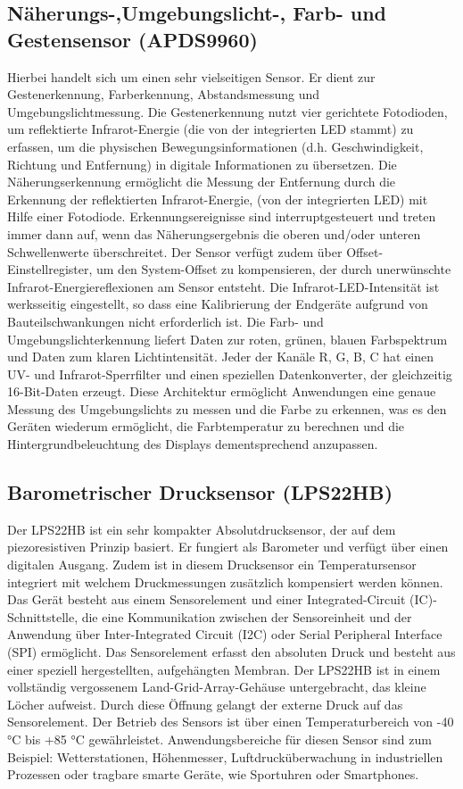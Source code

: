 \subsection{Näherungs-,Umgebungslicht-, Farb- und Gestensensor (APDS9960)}
	Hierbei handelt sich um einen sehr vielseitigen Sensor. Er dient zur Gestenerkennung, Farberkennung, Abstandsmessung und Umgebungslichtmessung. Die Gestenerkennung nutzt vier gerichtete Fotodioden, um reflektierte Infrarot-Energie (die von der integrierten LED stammt) zu erfassen, um die physischen Bewegungsinformationen (d.h. Geschwindigkeit, Richtung und Entfernung) in digitale Informationen zu übersetzen. Die Näherungserkennung ermöglicht die Messung der Entfernung durch die Erkennung der reflektierten Infrarot-Energie, (von der integrierten LED) mit Hilfe einer Fotodiode. Erkennungsereignisse sind interruptgesteuert und treten immer dann auf, wenn das Näherungsergebnis die oberen und/oder unteren Schwellenwerte überschreitet. Der Sensor verfügt zudem über Offset-Einstellregister, um den System-Offset zu kompensieren, der durch unerwünschte Infrarot-Energiereflexionen am Sensor entsteht. Die Infrarot-LED-Intensität ist werksseitig eingestellt, so dass eine Kalibrierung der Endgeräte aufgrund von Bauteilschwankungen nicht erforderlich ist. Die Farb- und Umgebungslichterkennung liefert Daten zur roten, grünen, blauen Farbspektrum und Daten zum klaren Lichtintensität. Jeder der Kanäle R, G, B, C hat einen UV- und Infrarot-Sperrfilter und einen speziellen Datenkonverter, der gleichzeitig 16-Bit-Daten erzeugt. Diese Architektur ermöglicht Anwendungen eine genaue Messung des Umgebungslichts zu messen und die Farbe zu erkennen, was es den Geräten wiederum ermöglicht, die Farbtemperatur zu berechnen und die Hintergrundbeleuchtung des Displays dementsprechend anzupassen.\cite{AT.2015}\cite{Ard.2024}
	
\subsection{Barometrischer Drucksensor (LPS22HB)}
	Der LPS22HB ist ein sehr kompakter Absolutdrucksensor, der auf dem piezoresistiven Prinzip basiert. Er fungiert als Barometer und verfügt über einen digitalen Ausgang. Zudem ist in diesem Drucksensor ein Temperatursensor integriert mit welchem Druckmessungen zusätzlich kompensiert werden können. Das Gerät besteht aus einem Sensorelement und einer Integrated-Circuit (IC)-Schnittstelle, die eine Kommunikation zwischen der Sensoreinheit und der Anwendung über Inter-Integrated Circuit (I2C) oder Serial Peripheral Interface (SPI) ermöglicht. Das Sensorelement erfasst den absoluten Druck und besteht aus einer speziell hergestellten, aufgehängten Membran. Der LPS22HB ist in einem vollständig vergossenem Land-Grid-Array-Gehäuse untergebracht, das kleine Löcher aufweist. Durch diese Öffnung gelangt der externe Druck auf das Sensorelement. Der Betrieb des Sensors ist über einen Temperaturbereich von -40 °C bis +85 °C gewährleistet. \cite{STM2.2017}\cite{Ard.2024}
	Anwendungsbereiche für diesen Sensor sind zum Beispiel: Wetterstationen, Höhenmesser, Luftdrucküberwachung in industriellen Prozessen oder tragbare smarte Geräte, wie Sportuhren oder Smartphones.
	
